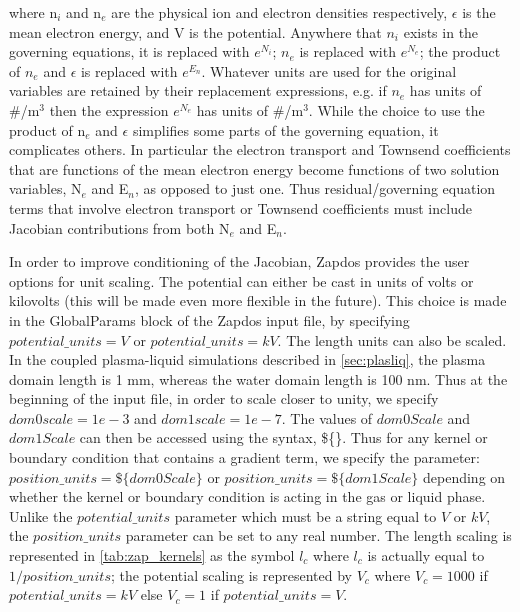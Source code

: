 where n$_i$ and n$_e$ are the physical ion and electron densities respectively, $\epsilon$ is the mean electron energy, and V is the potential. Anywhere that $n_i$ exists in the governing equations, it is replaced with $e^{N_i}$; $n_e$ is replaced with $e^{N_e}$; the product of $n_e$ and $\epsilon$ is replaced with $e^{E_n}$. Whatever units are used for the original variables are retained by their replacement expressions, e.g. if $n_e$ has units of \#/m$^3$ then the expression $e^{N_e}$ has units of \#/m$^3$. While the choice to use the product of n$_e$ and $\epsilon$ simplifies some parts of the governing equation, it complicates others. In particular the electron transport and Townsend coefficients that are functions of the mean electron energy become functions of two solution variables, N$_e$ and E$_n$, as opposed to just one. Thus residual/governing equation terms that involve electron transport or Townsend coefficients must include Jacobian contributions from both N$_e$ and E$_n$.

In order to improve conditioning of the Jacobian, Zapdos provides the user options for unit scaling. The potential can either be cast in units of volts or kilovolts (this will be made even more flexible in the future). This choice is made in the GlobalParams block of the Zapdos input file, by specifying $potential\_units = V$ or $potential\_units = kV$. The length units can also be scaled. In the coupled plasma-liquid simulations described in \cref{sec:plasliq}, the plasma domain length is 1 mm, whereas the water domain length is 100 nm. Thus at the beginning of the input file, in order to scale closer to unity, we specify $dom0scale = 1e-3$ and $dom1scale = 1e-7$. The values of $dom0Scale$ and $dom1Scale$ can then be accessed using the syntax, \$\{\}. \cite{GetPot} Thus for any kernel or boundary condition that contains a gradient term, we specify the parameter: $position\_units = \$\{dom0Scale\}$ or $position\_units = \$\{dom1Scale\}$ depending on whether the kernel or boundary condition is acting in the gas or liquid phase. Unlike the $potential\_units$ parameter which must be a string equal to $V$ or $kV$, the $position\_units$ parameter can be set to any real number. The length scaling is represented in \cref{tab:zap_kernels} as the symbol $l_c$ where $l_c$ is actually equal to $1/position\_units$; the potential scaling is represented by $V_c$ where $V_c=1000$ if $potential\_units=kV$ else $V_c=1$ if $potential\_units=V$.

